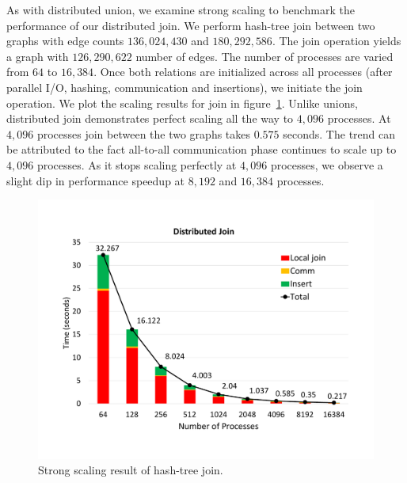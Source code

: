 As with distributed union, we examine strong scaling to benchmark the performance of our distributed join.
We perform hash-tree join between two graphs with edge counts $136,\!024,\!430$ and $180,\!292,\!586$. The join operation yields a graph with $126,\!290,\!622$ number of edges.
The number of processes are varied from $64$ to $16,\!384$. 
Once both relations are initialized across all processes (after parallel I/O, hashing, communication and insertions), we initiate the join operation. 
We plot the scaling results for join in figure~\ref{fig:dist_join}.
Unlike unions, distributed join demonstrates perfect scaling all the way to $4,\!096$ processes. At $4,\!096$ processes join between the two graphs takes $0.575$ seconds. The trend can be attributed to the fact all-to-all communication phase continues to scale up to $4,\!096$ processes.
As it stops scaling perfectly at $4,\!096$ processes, we observe a slight dip in performance speedup at $8,\!192$ and $16,\!384$ processes.


\begin{figure}[h]
	\includegraphics[width=\columnwidth]{results/join_new_final.pdf}
	\caption{Strong scaling result of hash-tree join.}
	\label{fig:dist_join}
\end{figure}





